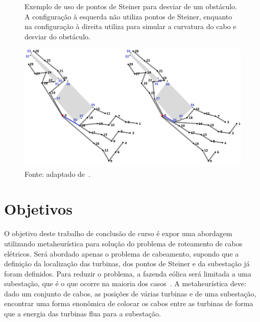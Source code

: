\begin{figure}[!htb]
  \centering
  \caption[Exemplo de uso de pontos Steiner]{
    Exemplo de uso de pontos de Steiner para desviar de um obstáculo.
    A configuração à esquerda não utiliza pontos de Steiner, enquanto na configuração à direita utiliza para simular a curvatura do cabo e desviar do obstáculo.
  }
  \includegraphics[scale=0.27]{estrutura/textuais/figuras/steiner-example-connected.png}
  \caption*{Fonte: adaptado de~.}
  \label{fig:steinerexample}
\end{figure}

\section{Objetivos}

O objetivo deste trabalho de conclusão de curso é expor uma abordagem utilizando metaheurística para solução do problema de roteamento de cabos elétricos.
Será abordado apenas o problema de cabeamento, supondo que a definição da localização das turbinas, dos pontos de Steiner e da subestação já foram definidos.
Para reduzir o problema, a fazenda eólica será limitada a uma subestação, que é o que ocorre na maioria dos casos~\cite{cazzaro2019}.
A metaheurística deve: dado um conjunto de cabos, as posições de várias turbinas e de uma subestação, encontrar uma forma enonômica de colocar os cabos entre as turbinas de forma que a energia das turbinas flua para a subestação.

